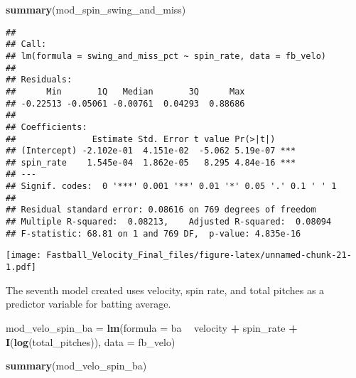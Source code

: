 \documentclass[]{article}
\newenvironment{Shaded}{\begin{snugshade}}{\end{snugshade}}
\newcommand{\KeywordTok}[1]{\textcolor[rgb]{0.13,0.29,0.53}{\textbf{#1}}}
\newcommand{\DataTypeTok}[1]{\textcolor[rgb]{0.13,0.29,0.53}{#1}}
\newcommand{\StringTok}[1]{\textcolor[rgb]{0.31,0.60,0.02}{#1}}
\newcommand{\OperatorTok}[1]{\textcolor[rgb]{0.81,0.36,0.00}{\textbf{#1}}}
\newcommand{\NormalTok}[1]{#1}
\begin{document}
\begin{Shaded}
\begin{Highlighting}[]
\KeywordTok{summary}\NormalTok{(mod_spin_swing_and_miss)}
\end{Highlighting}
\end{Shaded}

\begin{verbatim}
## 
## Call:
## lm(formula = swing_and_miss_pct ~ spin_rate, data = fb_velo)
## 
## Residuals:
##      Min       1Q   Median       3Q      Max 
## -0.22513 -0.05061 -0.00761  0.04293  0.88686 
## 
## Coefficients:
##               Estimate Std. Error t value Pr(>|t|)    
## (Intercept) -2.102e-01  4.151e-02  -5.062 5.19e-07 ***
## spin_rate    1.545e-04  1.862e-05   8.295 4.84e-16 ***
## ---
## Signif. codes:  0 '***' 0.001 '**' 0.01 '*' 0.05 '.' 0.1 ' ' 1
## 
## Residual standard error: 0.08616 on 769 degrees of freedom
## Multiple R-squared:  0.08213,    Adjusted R-squared:  0.08094 
## F-statistic: 68.81 on 1 and 769 DF,  p-value: 4.835e-16
\end{verbatim}

\begin{Shaded}
\end{Shaded}

\texttt{[image: Fastball\_Velocity\_Final\_files/figure-latex/unnamed-chunk-21-1.pdf]}

The seventh model created uses velocity, spin rate, and total pitches as
a predictor variable for batting average.

\begin{Shaded}
\begin{Highlighting}[]
\NormalTok{mod_velo_spin_ba =}\StringTok{ }\KeywordTok{lm}\NormalTok{(}\DataTypeTok{formula =}\NormalTok{ ba }\OperatorTok{~}\StringTok{ }\NormalTok{velocity }\OperatorTok{+}\StringTok{ }\NormalTok{spin_rate }\OperatorTok{+}\StringTok{ }\KeywordTok{I}\NormalTok{(}\KeywordTok{log}\NormalTok{(total_pitches)), }\DataTypeTok{data =}\NormalTok{ fb_velo)}
\end{Highlighting}
\end{Shaded}

\begin{Shaded}
\begin{Highlighting}[]
\KeywordTok{summary}\NormalTok{(mod_velo_spin_ba)}
\end{Highlighting}
\end{Shaded}
\end{document}
